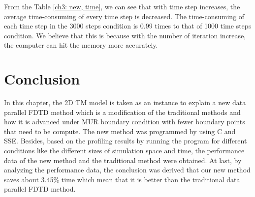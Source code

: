 From the Table \ref{ch3: new, time}, we can see that with time step increases, the average time-consuming of every time step is decreased.
The time-consuming of each time step in the 3000 steps condition is 0.99 times to that of 1000 time steps condition. We believe that this is because with the number of iteration increase, the computer can hit the memory more accurately.

\section{Conclusion}

In this chapter, the 2D TM model is taken as an instance to explain a new data parallel FDTD method which is a modification of the traditional methods and how it is advanced under MUR boundary condition with fewer boundary points that need to be compute. The new method was programmed by using C and SSE. Besides, based on the profiling results by running the program for different conditions like the different sizes of simulation space and time, the performance data of the new method and the traditional method were obtained. At last, by
analyzing the performance data, the conclusion was derived that our new method saves about 3.45\% time which mean that it is better than the traditional data parallel FDTD method.